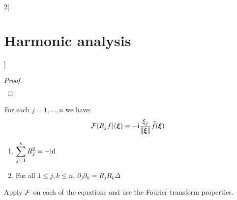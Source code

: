 \documentclass[../../../main_math.tex]{subfiles}
\begin{document}
\begin{multicols}{2}[\section{Harmonic analysis}]
\begin{proof}
\begin{multline*}
    \end{multline*}
  \end{proof}
  \begin{corollary}
    For each $j=1, \ldots, n$ we have: $$\mathcal{F}{(R_jf)}(\boldsymbol{\mathrm{\xi}})=-\mathrm{i}\frac{\xi_j}{\left\|\boldsymbol{\mathrm{\xi}}\right\|} \widehat{f}(\boldsymbol{\mathrm{\xi}})$$
  \end{corollary}
  \begin{proposition}\hfill
    \begin{enumerate}
      \item $\displaystyle\sum_{j=1}^{n}R_j^2=-\mathrm{id}$
      \item For all $1\leq j,k\leq n$, $\partial_j\partial_k=R_jR_k\Delta$
    \end{enumerate}
  \end{proposition}
  \begin{sproof}
    Apply $\mathcal{F}$ on each of the equations and use the Fourier transform properties.
  \end{sproof}
\end{multicols}
\end{document}
